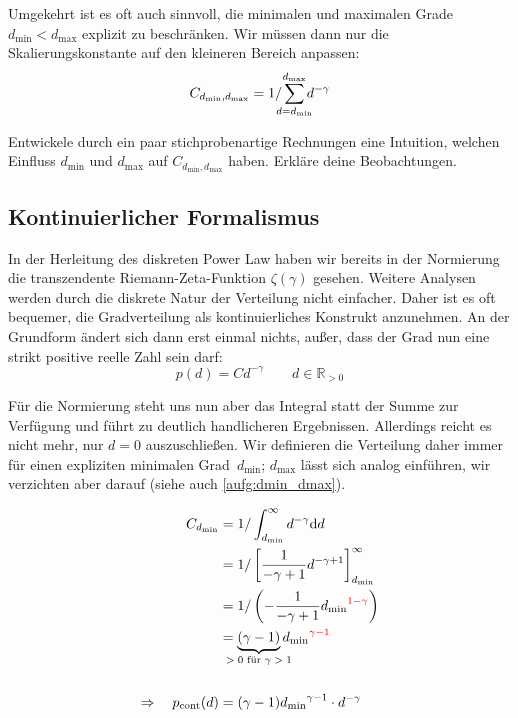 \def\dmin{\ensuremath{{d_{\text{min}}}}}
\def\dmax{\ensuremath{{d_{\text{max}}}}}
\def\dnc{\ensuremath{{d_{\text{nc}}}}}

Umgekehrt ist es oft auch sinnvoll, die minimalen und maximalen Grade $\dmin < \dmax$ explizit zu beschränken.
Wir müssen dann nur die Skalierungskonstante auf den kleineren Bereich anpassen:
\begin{equation}
    C_{\dmin,\dmax} = 1 / \smashoperator{\sum_{d = \dmin}^{\dmax}} d^{-\gamma}
\end{equation}

\begin{exercise}\label{aufg:dmin_dmax}
    Entwickele durch ein paar stichprobenartige Rechnungen eine Intuition, welchen Einfluss $\dmin$ und $\dmax$ auf $C_{\dmin,\dmax}$ haben.
    Erkläre deine Beobachtungen.
\end{exercise}

\subsection{Kontinuierlicher Formalismus}
In der Herleitung des diskreten Power Law haben wir bereits in der Normierung die transzendente Riemann-Zeta-Funktion $\zeta(\gamma)$ gesehen.
Weitere Analysen werden durch die diskrete Natur der Verteilung nicht einfacher.
Daher ist es oft bequemer, die Gradverteilung als kontinuierliches Konstrukt anzunehmen.
An der Grundform ändert sich dann erst einmal nichts, außer, dass der Grad nun eine strikt positive reelle Zahl sein darf:
\begin{equation}
    p(d) = C d^{-\gamma} \quad\quad d \in \mathbb R_{> 0}
\end{equation}

Für die Normierung steht uns nun aber das Integral statt der Summe zur Verfügung und führt zu deutlich handlicheren Ergebnissen.
Allerdings reicht es nicht mehr, nur $d = 0$ auszuschließen.
Wir definieren die Verteilung daher immer für einen expliziten minimalen Grad~\dmin; \dmax{} lässt sich analog einführen, wir verzichten aber darauf (siehe auch \cref{aufg:dmin_dmax}).

\begin{align}
    C_\dmin                           & = 1 / \int_{\dmin}^\infty d^{-\gamma} \intd d                                                \\
                                      & = 1 / \left[ \frac{1}{-\gamma + 1} d^{-\gamma + 1}  \right]_\dmin^\infty                       \\
                                      & = 1 / \left( - \frac{1}{-\gamma + 1} \dmin^{\textcolor{red}{1 - \gamma}}  \right)              \\
                                      & = \underbrace{( \gamma-1)}_{\mathclap{\textnormal{$> 0$ für $\gamma > 1$}}} \dmin^{\textcolor{red}{\gamma - 1}} \\
    \nonumber                                                                                                                          \\
    \Rightarrow\quad p_{\text{cont}}(d) & = (\gamma-1) \dmin^{\gamma - 1} \cdot d^{-\gamma}
\end{align}

